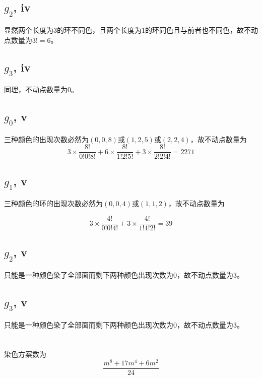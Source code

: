 \documentclass[8pt]{article}
\begin{document}
\subsection{$g_2$, iv}\label{iv2}
显然两个长度为$3$的环不同色，且两个长度为$1$的环同色且与前者也不同色，故不动点数量为$3! = 6$。
\subsection{$g_3$, iv}\label{iv3}
同理，不动点数量为$0$。

\subsection{$g_0$, v}\label{v0}
三种颜色的出现次数必然为$(0, 0, 8)$或$(1, 2, 5)$或$(2, 2, 4)$，故不动点数量为
\begin{equation}
3 \times \frac{8!}{0!0!8!} + 6 \times \frac{8!}{1!2!5!} + 3 \times \frac{8!}{2!2!4!} = 2271
\end{equation}
\subsection{$g_1$, v}\label{v1}
三种颜色的环的出现次数必然为$(0, 0, 4)$或$(1, 1, 2)$，故不动点数量为

\begin{equation}
3 \times \frac{4!}{0!0!4!} + 3 \times \frac{4!}{1!1!2!} = 39
\end{equation}
\subsection{$g_2$, v}\label{v2}
只能是一种颜色染了全部面而剩下两种颜色出现次数为$0$，故不动点数量为$3$。
\subsection{$g_3$, v}\label{v3}
只能是一种颜色染了全部面而剩下两种颜色出现次数为$0$，故不动点数量为$3$。

\section{}

染色方案数为
\begin{equation}
	\frac{m^8 + 17m^4 + 6m^2}{24}
\end{equation}
\end{document}
